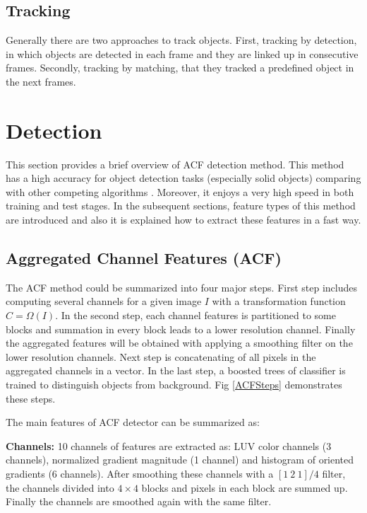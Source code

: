 \documentclass[conference]{IEEEtran}
\begin{document}
\subsection{Tracking}
Generally there are two approaches to track objects. First, tracking by detection, in which objects are detected in each frame and they are linked up in consecutive frames. Secondly, tracking by matching, that they tracked a predefined object in the next frames.


\section{Detection}
This section provides a brief overview of ACF detection \cite{dollar2014fast} method. This method has a high accuracy for object detection tasks (especially solid objects) comparing with other competing algorithms \cite{dollar2010fastest}. Moreover, it enjoys a very high speed in both training and test stages. In the subsequent sections, feature types of this method are introduced and also it is explained how to extract these features in a fast way.

\subsection{Aggregated Channel Features (ACF)}
The ACF method could be summarized into four major steps.
First step includes computing several channels for a given image $I$ with a transformation function $C=\Omega({I})$. In the second step, each channel features is partitioned to some blocks and summation in every block leads to a lower resolution channel. Finally the aggregated features will be obtained with applying a smoothing filter on the lower resolution channels. Next step is concatenating of all pixels in the aggregated channels in a vector. In the last step, a boosted trees of classifier is trained to distinguish objects from background. Fig \ref{ACFSteps} demonstrates these steps. 

The main features of ACF detector can be summarized as:

\textbf{Channels:} 
 10 channels of features are extracted as: LUV color channels (3 channels), normalized gradient magnitude (1 channel) and histogram of oriented gradients (6 channels). After smoothing these channels with a 
$[1\ 2\ 1]/4$ filter, 
the channels divided into $4 \times 4$ blocks and pixels in each block are summed up. Finally the channels are smoothed again with the same filter.
\end{document}
